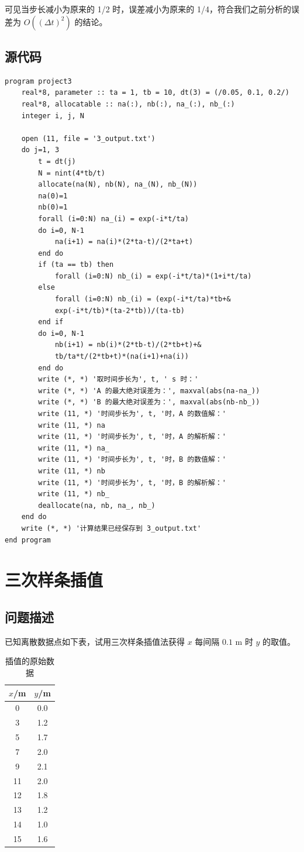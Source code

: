 \documentclass{ctexart}
\begin{document}
可见当步长减小为原来的 1/2 时，误差减小为原来的 1/4，符合我们之前分析的误差为 $O((\Delta t)^2)$ 的结论。
\subsection{源代码}
\begin{lstlisting}
program project3
	real*8, parameter :: ta = 1, tb = 10, dt(3) = (/0.05, 0.1, 0.2/)
	real*8, allocatable :: na(:), nb(:), na_(:), nb_(:)
	integer i, j, N

	open (11, file = '3_output.txt')
	do j=1, 3
		t = dt(j)
		N = nint(4*tb/t)
		allocate(na(N), nb(N), na_(N), nb_(N))
		na(0)=1
		nb(0)=1
		forall (i=0:N) na_(i) = exp(-i*t/ta)
		do i=0, N-1
			na(i+1) = na(i)*(2*ta-t)/(2*ta+t)
		end do
		if (ta == tb) then
			forall (i=0:N) nb_(i) = exp(-i*t/ta)*(1+i*t/ta)
		else
			forall (i=0:N) nb_(i) = (exp(-i*t/ta)*tb+&
			exp(-i*t/tb)*(ta-2*tb))/(ta-tb)
		end if
		do i=0, N-1
			nb(i+1) = nb(i)*(2*tb-t)/(2*tb+t)+&
			tb/ta*t/(2*tb+t)*(na(i+1)+na(i))
		end do
		write (*, *) '取时间步长为', t, ' s 时：'
		write (*, *) 'A 的最大绝对误差为：', maxval(abs(na-na_))
		write (*, *) 'B 的最大绝对误差为：', maxval(abs(nb-nb_))
		write (11, *) '时间步长为', t, '时，A 的数值解：'
		write (11, *) na
		write (11, *) '时间步长为', t, '时，A 的解析解：'
		write (11, *) na_
		write (11, *) '时间步长为', t, '时，B 的数值解：'
		write (11, *) nb
		write (11, *) '时间步长为', t, '时，B 的解析解：'
		write (11, *) nb_
		deallocate(na, nb, na_, nb_)
	end do
	write (*, *) '计算结果已经保存到 3_output.txt'
end program
\end{lstlisting}
\newpage
\section{三次样条插值}
\subsection{问题描述}
已知离散数据点如下表，试用三次样条插值法获得 $x$ 每间隔 $0.1$ m 时 $y$ 的取值。

\begin{table}[h]
\centering
\caption{插值的原始数据}
\begin{tabular}{cc}
\toprule
$x$/m & $y$/m \\ \midrule
0     & 0.0   \\
3     & 1.2   \\
5     & 1.7   \\
7     & 2.0   \\
9     & 2.1   \\
11    & 2.0   \\
12    & 1.8   \\
13    & 1.2   \\
14    & 1.0   \\
15    & 1.6   \\ \bottomrule
\end{tabular}
\end{table}
\end{document}
